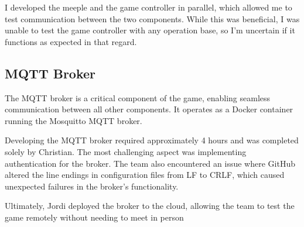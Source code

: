 \documentclass[../main.tex]{subfiles}
\begin{document}
I developed the meeple and the game controller in parallel, which allowed me to test communication between the two components. While this was beneficial, I was unable to test the game controller with any operation base, so I’m uncertain if it functions as expected in that regard.

\subsection{MQTT Broker}

The MQTT broker is a critical component of the game, enabling seamless communication between all other components. It operates as a Docker container running the Mosquitto MQTT broker.

Developing the MQTT broker required approximately 4 hours and was completed solely by Christian. The most challenging aspect was implementing authentication for the broker. The team also encountered an issue where GitHub altered the line endings in configuration files from LF to CRLF, which caused unexpected failures in the broker's functionality.

Ultimately, Jordi deployed the broker to the cloud, allowing the team to test the game remotely without needing to meet in person
\end{document}
